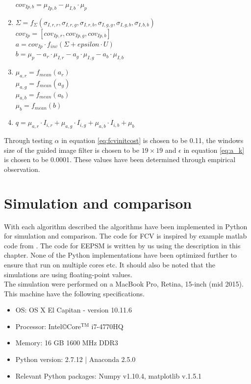 \begin{enumerate}
           $cov_{Ip,b} = \mu_{Ip,b} - \mu_{I,b} \cdot \mu_p$
  \item $\Sigma = f_{\Sigma}(\sigma_{I,r,r},\sigma_{I,r,g},\sigma_{I,r,b},\sigma_{I,g,g},\sigma_{I,g,b},\sigma_{I,b,b})$\\
           $cov_{Ip}= [cov_{Ip,r}, cov_{Ip,g}, cov_{Ip,b}]$\\
           $a = cov_{Ip}\cdot f_{inv}(\Sigma + epsilon\cdot U)$\\
           $b = \mu_p - a_r \cdot \mu_{I,r} - a_g \cdot \mu_{I,g} - a_b \cdot \mu_{I,b}$
  \item $\mu_{a,r} = f_{mean}(a_r)$\\
           $\mu_{a,g} = f_{mean}(a_g)$\\
           $\mu_{a,b} = f_{mean}(a_b)$\\
           $\mu_b = f_{mean}(b)$
  \item $q = \mu_{a,r} \cdot I_{i,r} +\mu_{a,g} \cdot I_{i,g}+\mu_{a,b} \cdot I_{i,b} + \mu_b$  
\end{enumerate}

Through testing $\alpha$ in equation \vref{eq:fcvinitcost} is chosen to be \num{0.11}, the windows size of the guided image filter is chosen to be $19\times19$ and $\epsilon$ in equation \vref{eq:a_k} is chosen to be \num{0.0001}. These values have been determined through empirical observation.

\section{Simulation and comparison}\label{sec:simucomp}
With each algorithm described the algorithms have been implemented in Python for simulation and comparison. The code for FCV is inspired by example matlab code from \cite{hosni2013fast}. The code for EEPSM is written by us using the description in this chapter. None of the Python implementations have been optimized further to ensure that run on multiple cores etc. It should also be noted that the simulations are using floating-point values.\\

The simulation were performed on a MacBook Pro, Retina, 15-inch (mid 2015). This machine have the following specifications.
\begin{itemize}
  \item OS: OS X El Capitan - version 10.11.6
  \item Processor: Intel\copyright  Core$^{\text{TM}}$ i7-4770HQ
  \item Memory: 16 GB 1600 MHz DDR3
  \item Python version: 2.7.12 | Anaconda 2.5.0
  \item Relevant Python packages: Numpy v1.10.4, matplotlib v.1.5.1
\end{itemize}

